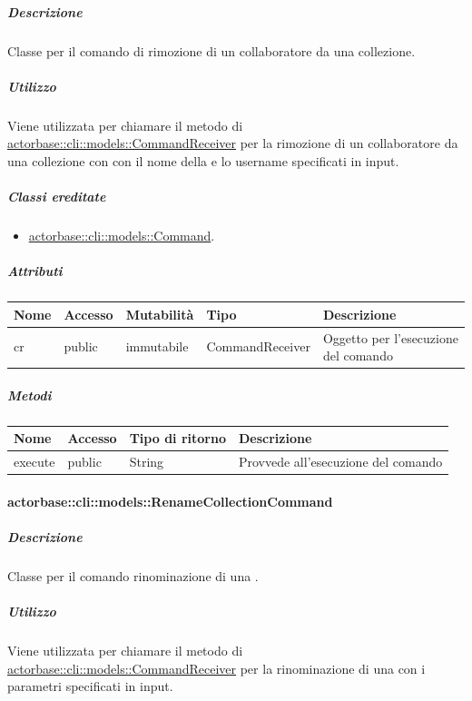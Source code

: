 \documentclass{scalatekids-article}
\begin{document}
\subparagraph{Descrizione}

Classe per il comando di rimozione di un collaboratore da una collezione.

\subparagraph{Utilizzo}

Viene utilizzata per chiamare il metodo di
\hyperref[sec:actorbase::cli::models::CommandReceiver]{actorbase::cli::models::CommandReceiver} per la rimozione di un collaboratore
da una collezione con con il nome della  e lo username
specificati in input.

\subparagraph{Classi ereditate}

\begin{itemize}
\item \hyperref[sec:actorbase::cli::models::Command]{actorbase::cli::models::Command}.
\end{itemize}

\subparagraph{Attributi}

\begin{tabular}{| p{1cm} | p{1.5cm} | p{2cm} | p{4cm} | p{8.5cm} |}
  \hline
  Nome & Accesso & Mutabilità & Tipo & Descrizione\\
  \hline
  cr & public & immutabile & CommandReceiver & Oggetto per l'esecuzione del comando\\
  \hline
\end{tabular}

\subparagraph{Metodi}

\begin{tabular}{| l | l | l | l |}
  \hline
  Nome & Accesso & Tipo di ritorno & Descrizione\\
  \hline
  execute & public & String & Provvede all'esecuzione del comando\\
  \hline
\end{tabular}

\paragraph{actorbase::cli::models::RenameCollectionCommand}
\label{sec:actorbase::cli::models::RenameCollectionCommand}

\subparagraph{Descrizione}

Classe per il comando rinominazione di una .

\subparagraph{Utilizzo}

Viene utilizzata per chiamare il metodo di \hyperref[sec:actorbase::cli::models::CommandReceiver]{actorbase::cli::models::CommandReceiver} per la rinominazione di una  con i parametri specificati in input.
\end{document}
